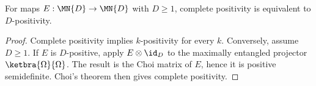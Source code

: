 \begin{theorem}
    \label{thm:d_positive_iff_completely_positive}
    \leanok
    For maps $E:\MN{D}\to\MN{D}$ with $D\ge 1$, complete positivity is
    equivalent to $D$-positivity.
\end{theorem}

\begin{proof}
    \leanok
    Complete positivity implies $k$-positivity for every $k$. Conversely,
    assume $D\ge 1$. If $E$ is $D$-positive, apply $E\otimes\id_D$ to the
    maximally entangled projector $\ketbra{\Omega}{\Omega}$. The result is
    the Choi matrix of $E$, hence it is positive semidefinite. Choi's theorem
    then gives complete positivity.
\end{proof}
